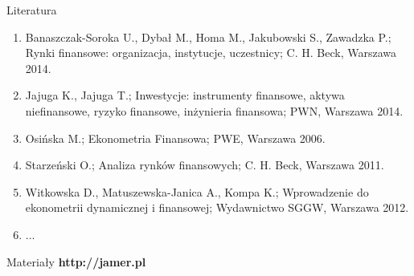 \documentclass[a4paper, 11pt]{beamer}
\begin{document}
	\begin{frame}{Literatura}
		\begin{enumerate}
			\item Banaszczak-Soroka U., Dybał M., Homa M., Jakubowski S., Zawadzka P.; Rynki finansowe: organizacja, instytucje, uczestnicy; C. H. Beck, Warszawa 2014.
			\item Jajuga K., Jajuga T.; Inwestycje: instrumenty finansowe, aktywa niefinansowe, ryzyko finansowe, inżynieria finansowa; PWN, Warszawa 2014.
			\item Osińska M.; Ekonometria Finansowa; PWE, Warszawa 2006.
			\item Starzeński O.; Analiza rynków finansowych; C. H. Beck, Warszawa 2011.
			\item Witkowska D., Matuszewska-Janica A., Kompa K.; Wprowadzenie do ekonometrii dynamicznej i finansowej; Wydawnictwo SGGW, Warszawa 2012.
			\item ...
		\end{enumerate}
	\end{frame}
	
	\begin{frame}{Materiały}
		\Huge\bfseries
		\centering
		http://jamer.pl
	\end{frame}
\end{document}
